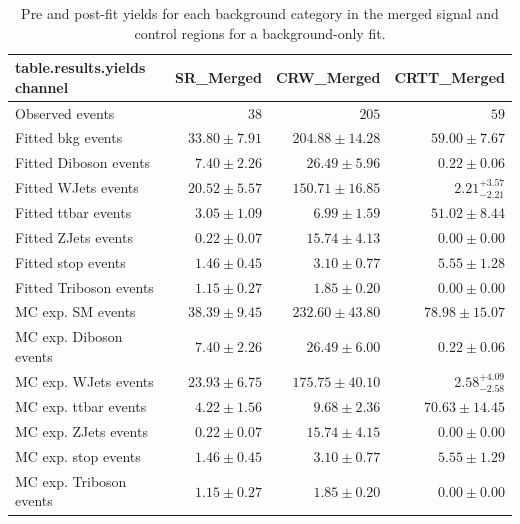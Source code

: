 \begin{table}[t]
\centering
\small
\begin{tabular*}{\textwidth}{@{\extracolsep{\fill}}lrrr}
\toprule
\textbf{table.results.yields channel}           & SR\_Merged            & CRW\_Merged            & CRTT\_Merged              \\
\midrule
Observed events          & $38$              & $205$              & $59$                    \\
\midrule
Fitted bkg events         & $33.80 \pm 7.91$          & $204.88 \pm 14.28$          & $59.00 \pm 7.67$              \\
\midrule
        Fitted Diboson events         & $7.40 \pm 2.26$          & $26.49 \pm 5.96$          & $0.22 \pm 0.06$              \\
        Fitted WJets events         & $20.52 \pm 5.57$          & $150.71 \pm 16.85$          & $2.21_{-2.21}^{+3.57}$              \\
        Fitted ttbar events         & $3.05 \pm 1.09$          & $6.99 \pm 1.59$          & $51.02 \pm 8.44$              \\
        Fitted ZJets events         & $0.22 \pm 0.07$          & $15.74 \pm 4.13$          & $0.00 \pm 0.00$              \\
        Fitted stop events         & $1.46 \pm 0.45$          & $3.10 \pm 0.77$          & $5.55 \pm 1.28$              \\
        Fitted Triboson events         & $1.15 \pm 0.27$          & $1.85 \pm 0.20$          & $0.00 \pm 0.00$              \\
 \midrule
MC exp. SM events              & $38.39 \pm 9.45$          & $232.60 \pm 43.80$          & $78.98 \pm 15.07$              \\
\midrule
        MC exp. Diboson events         & $7.40 \pm 2.26$          & $26.49 \pm 6.00$          & $0.22 \pm 0.06$              \\
        MC exp. WJets events         & $23.93 \pm 6.75$          & $175.75 \pm 40.10$          & $2.58_{-2.58}^{+4.09}$              \\
        MC exp. ttbar events         & $4.22 \pm 1.56$          & $9.68 \pm 2.36$          & $70.63 \pm 14.45$              \\
        MC exp. ZJets events         & $0.22 \pm 0.07$          & $15.74 \pm 4.15$          & $0.00 \pm 0.00$              \\
        MC exp. stop events         & $1.46 \pm 0.45$          & $3.10 \pm 0.77$          & $5.55 \pm 1.29$              \\
        MC exp. Triboson events         & $1.15 \pm 0.27$          & $1.85 \pm 0.20$          & $0.00 \pm 0.00$              \\
\bottomrule
\end{tabular*}
\caption{Pre and post-fit yields for each background category in the merged signal and control regions for a background-only fit.}
\label{tab:yields_mgd}
\end{table}

